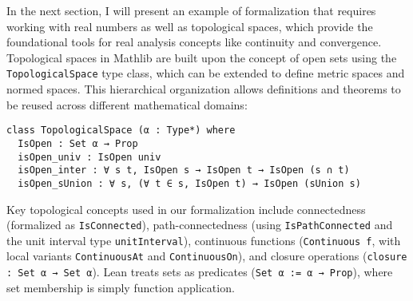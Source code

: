 
In the next section, I will present an example of formalization that requires working with
real numbers as well as topological spaces, which provide the foundational tools for
real analysis concepts like continuity and convergence.
Topological spaces in Mathlib are built upon the concept of open sets
using the \lstinline[language=lean]|TopologicalSpace| type class,
which can be extended to define metric spaces and normed spaces.
This hierarchical organization allows definitions and theorems to be reused across
different mathematical domains:
\begin{lstlisting}[language=lean]
class TopologicalSpace (α : Type*) where
  IsOpen : Set α → Prop
  isOpen_univ : IsOpen univ
  isOpen_inter : ∀ s t, IsOpen s → IsOpen t → IsOpen (s ∩ t)
  isOpen_sUnion : ∀ s, (∀ t ∈ s, IsOpen t) → IsOpen (sUnion s)
\end{lstlisting}
Key topological concepts used in our formalization include connectedness
(formalized as \lstinline[language=lean]|IsConnected|),
path-connectedness (using \lstinline[language=lean]|IsPathConnected|
and the unit interval type \lstinline[language=lean]|unitInterval|),
continuous functions (\lstinline[language=lean]|Continuous f|,
with local variants \lstinline[language=lean]|ContinuousAt|
and \lstinline[language=lean]|ContinuousOn|), and closure operations
(\lstinline[language=lean]|closure : Set α → Set α|).
Lean treats sets as predicates
(\lstinline[language=lean]|Set α := α → Prop|),
where set membership is simply function application.


